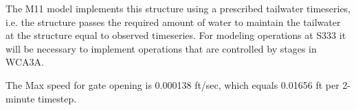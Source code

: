 %
%
%
%



The M11 model implements this structure using a prescribed tailwater timeseries, i.e. the structure passes the required amount of water to maintain the tailwater at the structure equal to observed timeseries. For modeling operations at S333 it will be necessary to implement operations that are controlled by stages in WCA3A.


The Max speed for gate opening is 0.000138 ft/sec, which equals 0.01656 ft per 2-minute timestep.

